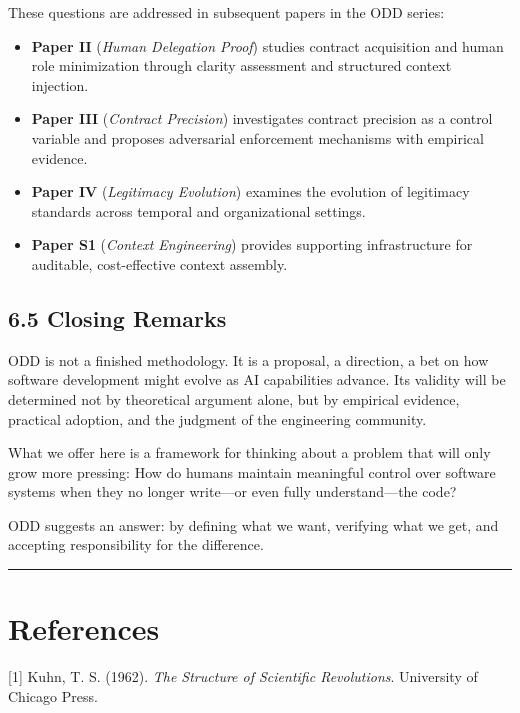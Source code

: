 \documentclass[
]{article}
\begin{document}
These questions are addressed in subsequent papers in the ODD series:

\begin{itemize}
\item
  \textbf{Paper II} (\emph{Human Delegation Proof}) studies contract
  acquisition and human role minimization through clarity assessment and
  structured context injection.
\item
  \textbf{Paper III} (\emph{Contract Precision}) investigates contract
  precision as a control variable and proposes adversarial enforcement
  mechanisms with empirical evidence.
\item
  \textbf{Paper IV} (\emph{Legitimacy Evolution}) examines the evolution
  of legitimacy standards across temporal and organizational settings.
\item
  \textbf{Paper S1} (\emph{Context Engineering}) provides supporting
  infrastructure for auditable, cost-effective context assembly.
\end{itemize}

\hypertarget{65-closing-remarks}{%
\subsection{6.5 Closing Remarks}\label{65-closing-remarks}}

ODD is not a finished methodology. It is a proposal, a direction, a bet
on how software development might evolve as AI capabilities advance. Its
validity will be determined not by theoretical argument alone, but by
empirical evidence, practical adoption, and the judgment of the
engineering community.

What we offer here is a framework for thinking about a problem that will
only grow more pressing: How do humans maintain meaningful control over
software systems when they no longer write---or even fully
understand---the code?

ODD suggests an answer: by defining what we want, verifying what we get,
and accepting responsibility for the difference.

\begin{center}\rule{0.5\linewidth}{0.5pt}\end{center}

\hypertarget{references}{%
\section{References}\label{references}}

{[}1{]} Kuhn, T. S. (1962). \emph{The Structure of Scientific
Revolutions}. University of Chicago Press.
\end{document}
